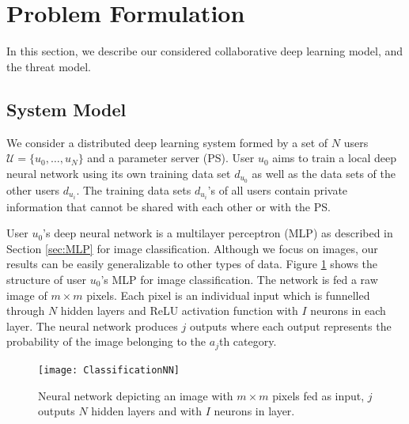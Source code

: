 \documentclass[conference]{IEEEtran}
\begin{document}
\section{Problem Formulation}
In this section, we describe our considered collaborative deep learning model, and the threat model. 

\subsection{System Model} \label{sec:systemModel}

We consider a distributed deep learning system formed by a set of $N$ users $\mathcal{U}= \{u_0, \dots,u_N\}$ and
a parameter server (PS). User $u_0$ aims to train a local deep neural network using its own training data set
$d_{u_0}$ as well as the data sets of the other users $d_{u_i}$. %
The training data sets $d_{u_i}$'s of all users contain private information that cannot be shared with each other or with the PS.  

User $u_0$'s deep neural network is a multilayer perceptron (MLP) as described in Section \ref{sec:MLP} for image classification.
Although we focus on images, our results can be easily generalizable to other types of data. 
Figure \ref{fig:ClassNN} shows the structure of user $u_0$'s MLP for image classification. The network is fed a raw image of  $m
\times m$ pixels. Each pixel is an individual input which is funnelled through $N$ hidden layers and ReLU activation function with $I$
neurons in each layer. The neural network produces $j$ outputs where each output represents the probability of the image belonging to
the $a_j$th category. 
\begin{figure}[!h]
\texttt{[image: ClassificationNN]}
\caption{Neural network depicting an image with $m \times m$ pixels fed as input, $j$ outputs  $N$  hidden layers and with $I$ neurons in layer.}
\label{fig:ClassNN}
\end{figure}
\end{document}
